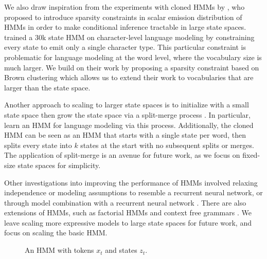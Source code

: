 \documentclass[11pt,a4paper]{article}
\begin{document}
We also draw inspiration from the experiments with
cloned HMMs by \citet{dedieu2019learning},
who proposed to introduce sparsity constraints in scalar
emission distribution of HMMs in order to make conditional inference
tractable in large state spaces.
\citet{dedieu2019learning} trained a 30k state HMM on character-level language modeling
by constraining every state to emit only a single character type.
This particular constraint is problematic for language modeling at the word level,
where the vocabulary size is much larger.
We build on their work by proposing a sparsity constraint based on
Brown clustering \citep{brown1992} which allows us to extend their
work to vocabularies that are larger than the state space.

Another approach to scaling to larger state spaces is to initialize
with a small state space then grow the state space via a split-merge process
\citep{petrov2006splitmerge,huang2011thesis}.
In particular, \citet{huang2011thesis} learn an HMM for language modeling
via this process.
Additionally, the cloned HMM \citep{dedieu2019learning} can be seen
as an HMM that starts with a single state per word,
then splits every state into $k$ states at the start
with no subsequent splits or merges.
The application of split-merge is an avenue for future work,
as we focus on fixed-size state spaces for simplicity.

Other investigations into improving the performance of HMMs
involved relaxing independence or modeling assumptions \citep{buys2018hmm}
to resemble a recurrent neural network, or through model combination
with a recurrent neural network \citep{krakovna2016hmm}.
There are also extensions of HMMs, such as factorial HMMs \cite{zoubin1997fhmm,nepal2013fhmm}
and context free grammars \citep{kim2019cpcfg}.
We leave scaling more expressive models to large state spaces for future work,
and focus on scaling the basic HMM.

\begin{figure}[t]
\centering
{}

\caption{
\label{fig:hmm}
An HMM with tokens $x_t$ and states $z_t$.
}
\end{figure}
\end{document}
